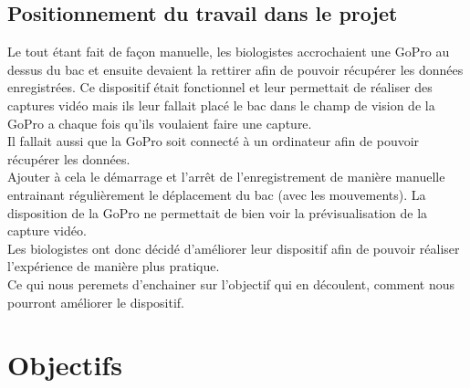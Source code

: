     \subsection{Positionnement du travail dans le projet}
    
    \begin{flushleft}
        Le tout étant fait de façon manuelle, les biologistes accrochaient une GoPro au dessus du bac et ensuite devaient la rettirer afin de pouvoir récupérer les données enregistrées. Ce dispositif était fonctionnel et leur permettait de réaliser des captures vidéo mais ils leur fallait placé le bac dans le champ de vision de la GoPro a chaque fois qu'ils voulaient faire une capture.\\[0.2cm]
        
        Il fallait aussi que la GoPro soit connecté à un ordinateur afin de pouvoir récupérer les données.\\[0.2cm]

        Ajouter à cela le démarrage et l'arrêt de l'enregistrement de manière manuelle entrainant régulièrement le déplacement du bac (avec les mouvements). La disposition de la GoPro ne permettait de bien voir la prévisualisation de la capture vidéo.\\[0.2cm]

        Les biologistes ont donc décidé d'améliorer leur dispositif afin de pouvoir réaliser l'expérience de manière plus pratique.\\[0.2cm]

        Ce qui nous peremets d'enchainer sur l'objectif qui en découlent, comment nous pourront améliorer le dispositif.

    \end{flushleft}

    \vspace{0.1cm}


    \section{Objectifs}
    
